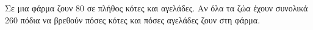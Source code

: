 Σε μια φάρμα ζουν 80 σε πλήθος κότες και αγελάδες. Αν όλα τα ζώα έχουν συνολικά 260 πόδια να βρεθούν πόσες κότες και πόσες αγελάδες ζουν στη φάρμα.
